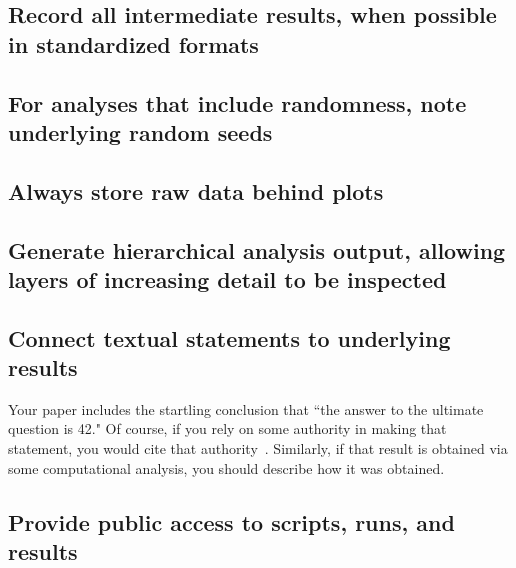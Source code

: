 \documentclass[11pt]{article}
\newcommand\ian[1]{}
\newcommand\ian[1]{{\color{red}[Ian: #1]}}
\begin{document}
\subsection{Record all intermediate results, when possible in standardized formats}

\subsection{For analyses that include randomness, note underlying random seeds} 



\subsection{Always store raw data behind plots} 



\subsection{Generate hierarchical analysis output, allowing layers of increasing detail to be inspected} 

\subsection{Connect textual statements to underlying results} 

Your paper includes the startling conclusion that ``the answer to the ultimate question is 42." 
Of course, if you rely on some authority in making that statement, you would cite that authority~\cite{Adams}.
Similarly, if that result is obtained via some computational analysis, you should describe how it was obtained.

\ian{We'd add: And any number that appears in a paper!}

\subsection{Provide public access to scripts, runs, and results} 
\end{document}
